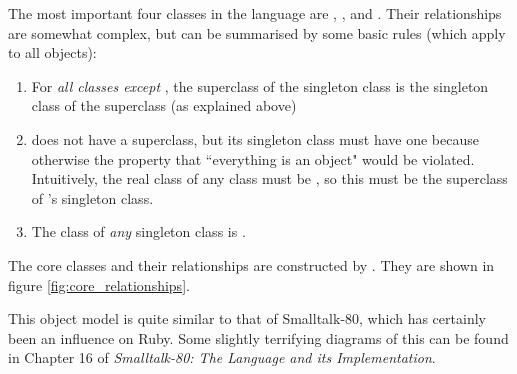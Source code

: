 The most important four classes in the language are , ,  and . Their relationships are somewhat complex, but can be summarised by some basic rules (which apply to all objects):

\begin{enumerate}
  \item For \textit{all classes except }, the superclass of the singleton class is the singleton class of the superclass (as explained above)
  \item {} does not have a superclass, but its singleton class must have one because otherwise the property that ``everything is an object" would be violated. Intuitively, the real class of any class must be , so this must be the superclass of 's singleton class.
  \item The class of \textit{any} singleton class is .
\end{enumerate}

The core classes and their relationships are constructed by . They are shown in figure \ref{fig:core_relationships}.

This object model is quite similar to that of Smalltalk-80, which has certainly been an influence on Ruby. Some slightly terrifying diagrams of this can be found in Chapter 16 of \textit{Smalltalk-80: The Language and its Implementation}.

